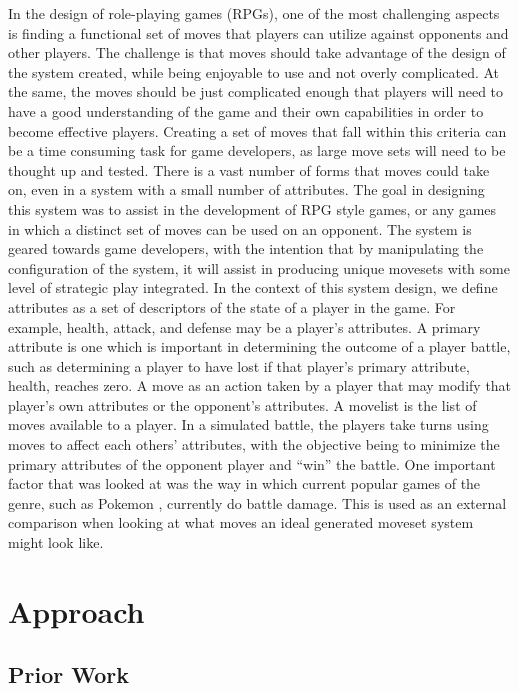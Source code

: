 \documentclass{acm_proc_article-sp}
\begin{document}
In the design of role-playing games (RPGs), one of the most challenging aspects is finding a functional set of moves that players can utilize against opponents and other players. The challenge is that moves should take advantage of the design of the system created, while being enjoyable to use and not overly complicated. At the same, the moves should be just complicated enough that players will need to have a good understanding of the game and their own capabilities in order to become effective players. Creating a set of moves that fall within this criteria can be a time consuming task for game developers, as large move sets will need to be thought up and tested. There is a vast number of forms that moves could take on, even in a system with a small number of attributes.
The goal in designing this system was to assist in the development of RPG style games, or any games in which a distinct set of moves can be used on an opponent. The system is geared towards game developers, with the intention that by manipulating the configuration of the system, it will assist in producing unique movesets with some level of strategic play integrated.
In the context of this system design, we define attributes as a set of descriptors of the state of a player in the game. For example, health, attack, and defense may be a player’s attributes. A primary attribute is one which is important in determining the outcome of a player battle, such as determining a player to have lost if that player’s primary attribute, health, reaches zero. A move as an action taken by a player that may modify that player’s own attributes or the opponent’s attributes. A movelist is the list of moves available to a player. In a simulated battle, the players take turns using moves to affect each others’ attributes, with the objective being to minimize the primary attributes of the opponent player and “win” the battle. One important factor that was looked at was the way in which current popular games of the genre, such as Pokemon \cite{website:pokemon_calculations}, currently do battle damage. This is used as an external comparison when looking at what moves an ideal generated moveset system might look like.

\section{Approach}

\subsection{Prior Work}
\end{document}
